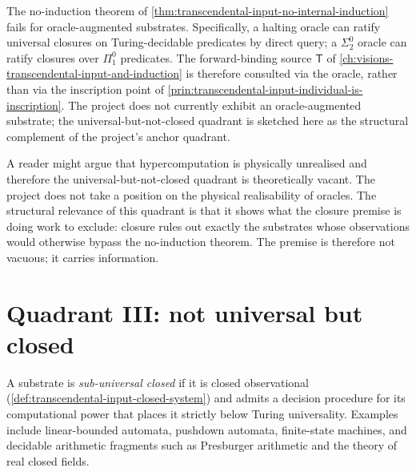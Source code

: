 \begin{principle}
\label{prin:quadrant-open-universal-lose-no-induction}
The no-induction theorem of \autoref{thm:transcendental-input-no-internal-induction} fails for oracle-augmented substrates. Specifically, a halting oracle can ratify universal closures on Turing-decidable predicates by direct query; a $\Sigma^0_2$ oracle can ratify closures over $\Pi^0_1$ predicates. The forward-binding source $\mathsf{T}$ of \autoref{ch:visions-transcendental-input-and-induction} is therefore consulted via the oracle, rather than via the inscription point of \autoref{prin:transcendental-input-individual-is-inscription}. The project does not currently exhibit an oracle-augmented substrate; the universal-but-not-closed quadrant is sketched here as the structural complement of the project's anchor quadrant.
\end{principle}

\begin{remark}
\label{rem:quadrant-open-universal-matters}
A reader might argue that hypercomputation is physically unrealised and therefore the universal-but-not-closed quadrant is theoretically vacant. The project does not take a position on the physical realisability of oracles. The structural relevance of this quadrant is that it shows what the closure premise is doing work to exclude: closure rules out exactly the substrates whose observations would otherwise bypass the no-induction theorem. The premise is therefore not vacuous; it carries information.
\end{remark}

\section{Quadrant III: not universal but closed}
\label{sec:quadrant-subuniversal-closed}

\begin{definition}
\label{def:quadrant-subuniversal-closed-substrate}
A substrate is \emph{sub-universal closed} if it is closed observational (\autoref{def:transcendental-input-closed-system}) and admits a decision procedure for its computational power that places it strictly below Turing universality. Examples include linear-bounded automata, pushdown automata, finite-state machines, and decidable arithmetic fragments such as Presburger arithmetic and the theory of real closed fields.
\end{definition}

